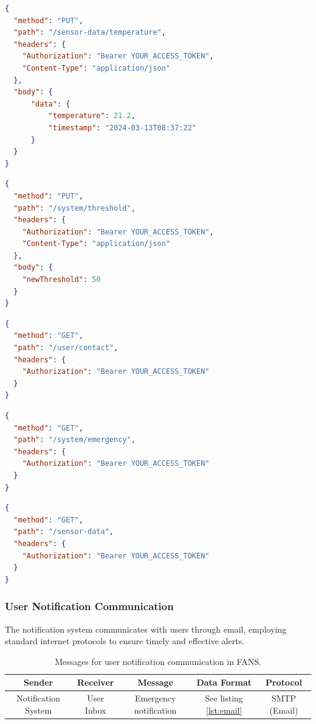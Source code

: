 {
\tiny
\begin{lstlisting}[language=json,label={lst:sensor},caption={Update sensor data message.}]
{
  "method": "PUT",
  "path": "/sensor-data/temperature",
  "headers": {
    "Authorization": "Bearer YOUR_ACCESS_TOKEN",
    "Content-Type": "application/json"
  },
  "body": {
      "data": {
          "temperature": 21.2,
          "timestamp": "2024-03-13T08:37:22"
      }
  }
}
\end{lstlisting}

\begin{lstlisting}[language=json,label={lst:threshold},caption={Threshold update message.}]
{
  "method": "PUT",
  "path": "/system/threshold",
  "headers": {
    "Authorization": "Bearer YOUR_ACCESS_TOKEN",
    "Content-Type": "application/json"
  },
  "body": {
    "newThreshold": 50
  }
}
\end{lstlisting}

\begin{lstlisting}[language=json,label={lst:contact},caption={Request for user contact information.}]
{
  "method": "GET",
  "path": "/user/contact",
  "headers": {
    "Authorization": "Bearer YOUR_ACCESS_TOKEN"
  }
}
\end{lstlisting}

\begin{lstlisting}[language=json,label={lst:emergency},caption={Request for emergency flag.}]
{
  "method": "GET",
  "path": "/system/emergency",
  "headers": {
    "Authorization": "Bearer YOUR_ACCESS_TOKEN"
  }
}
\end{lstlisting}

\begin{lstlisting}[language=json,label={lst:sensor-get},caption={Request for latest sensor data.}]
{
  "method": "GET",
  "path": "/sensor-data",
  "headers": {
    "Authorization": "Bearer YOUR_ACCESS_TOKEN"
  }
}
\end{lstlisting}
}

\subsubsection{User Notification Communication}

The notification system communicates with users through email, employing standard internet protocols to ensure timely
and effective alerts.

\begin{table}[H]
    \centering
    \begin{tabular}{| c | c | c | c | c |}
        \hline
        Sender              & Receiver   & Message                & Data Format                 & Protocol     \\
        \hline
        Notification System & User Inbox & Emergency notification & See listing \ref{lst:email} & SMTP (Email) \\
        \hline
    \end{tabular}
    \caption{Messages for user notification communication in FANS.}
\end{table}

